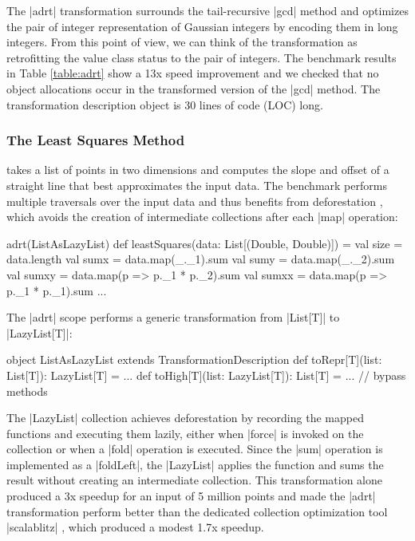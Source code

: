 The |adrt| transformation surrounds the tail-recursive |gcd| method and optimizes the pair of integer representation of Gaussian integers by encoding them in long integers. From this point of view, we can think of the transformation as retrofitting the value class status to the pair of integers. The benchmark results in Table \ref{table:adrt} show a 13x speed improvement and we checked that no object allocations occur in the transformed version of the |gcd| method. The transformation description object is 30 lines of code (LOC) long.

\subsubsection{The Least Squares Method} takes a list of points in two dimensions and computes the slope and offset of a straight line that best approximates the input data. The benchmark performs multiple traversals over the input data and thus benefits from deforestation \cite{wadler-deforestation}, which avoids the creation of intermediate collections after each |map| operation:

\begin{lstlisting-nobreak}
adrt(ListAsLazyList){
  def leastSquares(data: List[(Double, Double)]) = {
    val size = data.length
    val sumx = data.map(_._1).sum
    val sumy = data.map(_._2).sum
    val sumxy = data.map(p => p._1 * p._2).sum
    val sumxx = data.map(p => p._1 * p._1).sum
    ...
  }
}
\end{lstlisting-nobreak}

\noindent
The |adrt| scope performs a generic transformation from |List[T]| to |LazyList[T]|:

\begin{lstlisting-nobreak}
object ListAsLazyList extends TransformationDescription {
  def toRepr[T](list: List[T]): LazyList[T] = ...
  def toHigh[T](list: LazyList[T]): List[T] = ...
  // bypass methods
}
\end{lstlisting-nobreak}

The |LazyList| collection achieves deforestation by recording the mapped functions and executing them lazily, either when |force| is invoked on the collection or when a |fold| operation is executed. Since the |sum| operation is implemented as a |foldLeft|, the |LazyList| applies the function and sums the result without creating an intermediate collection. This transformation alone produced a 3x speedup for an input of 5 million points and made the |adrt| transformation perform better than the dedicated collection optimization tool |scalablitz| \cite{scalablitz, scalablitz-paper}, which produced a modest 1.7x speedup.

